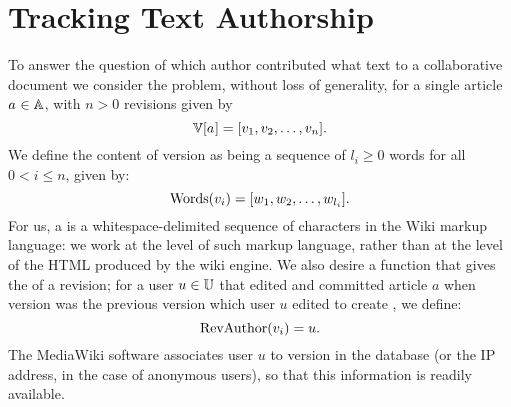 \section{Tracking Text Authorship}
\label{sec:diff-tracking}

To answer the question of which author contributed what text to a
collaborative document
we consider the problem, without loss of generality, for
a single article $a_{} \in \mathbb{A}$,
with $n > 0$ revisions given by
\begin{equation*}
\versions{\article{}} = [ \version{1}, \version{2}, \ldots, \version{n} ].
\end{equation*}
We define the content of version 
as being a sequence of $l_i \ge 0$ words for all $0 < i \le n$,
given by:
\begin{equation}
\words{\version{i}} = [ w_1, w_2, \ldots, w_{l_i} ].
\label{def:words}
\end{equation}
For us, a  is a whitespace-delimited sequence of
characters in the Wiki markup language:
we work at the level of such markup language, rather than at the level
of the HTML produced by the wiki engine.
We also desire a function that gives the  of a
revision; for a user $u \in \mathbb{U}$
that edited and committed article $a$ when version 
was the previous version which user $u$ edited to create ,
we define:
\begin{equation}
\revauthor{\version{i}} = u.
\label{def:revauthor}
\end{equation}
The MediaWiki software associates user $u$ to version  in
the database (or the IP address, in the case of anonymous users),
so that this information is readily available.




